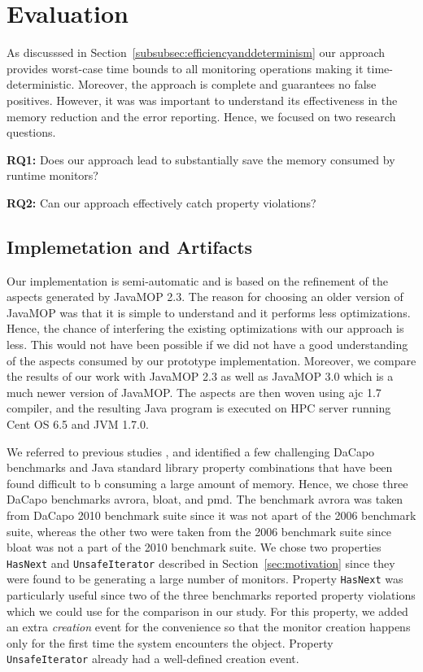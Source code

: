 \section{Evaluation}
\label{sec:evaluation}

As discusssed in Section~\ref{subsubsec:efficiencyanddeterminism} our approach 
provides worst-case time bounds to all monitoring operations making it 
time-deterministic. Moreover, the approach is complete and guarantees no false 
positives. However, it was was important to understand its effectiveness in the 
memory reduction and the error reporting. Hence, we focused on two research 
questions.

{\bf RQ1:} Does our approach lead to substantially save the memory consumed by 
runtime monitors?

{\bf RQ2:} Can our approach effectively catch property violations?

\subsection{Implemetation and Artifacts}
\label{subsec:implementation}

Our implementation is semi-automatic and is based on the refinement of the 
aspects generated by JavaMOP 2.3. The reason for choosing an older version of 
JavaMOP was that it is simple to understand and it performs less optimizations. 
Hence, the chance of interfering the existing optimizations with our approach is 
less. This would not have been possible if we did not have a good understanding 
of the aspects consumed by our prototype implementation. Moreover, we compare 
the results of our work with JavaMOP 2.3 as well as JavaMOP 3.0 which is a much 
newer version of JavaMOP. The aspects are then woven using ajc 1.7 compiler, and 
the resulting Java program is executed on HPC server running Cent OS 6.5 and JVM 
1.7.0. 

We referred to previous studies \cite{}, and identified a few challenging DaCapo 
benchmarks and Java standard library property combinations that have been found 
difficult to b consuming a large amount of memory. Hence, we chose three DaCapo 
benchmarks \textsf{avrora}, \textsf{bloat}, and \textsf{pmd}. The benchmark 
\textsf{avrora} was taken from DaCapo 2010 benchmark suite since it was not 
apart of the 2006 benchmark suite, whereas the other two were taken from the 
2006 benchmark suite since \textsf{bloat} was not a part of the 2010 benchmark 
suite. We chose two properties \texttt{HasNext} and \texttt{UnsafeIterator} 
described in Section~\ref{sec:motivation} since they were found to be generating 
a large number of monitors. Property \texttt{HasNext} was particularly useful 
since two of the three benchmarks reported property violations which we could 
use for the comparison in our study. For this property, we added an extra 
\textit{creation} event for the convenience so that the monitor creation happens 
only  for the first time the system encounters the object. Property 
\texttt{UnsafeIterator} already had a well-defined creation event.


